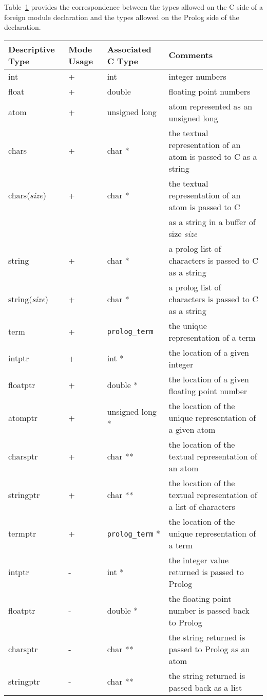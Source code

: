 Table~\ref{table:hltypes} provides the correspondence between the types
allowed on the C side of a foreign module declaration and the types allowed
on the Prolog side of the declaration.

\begin{table}
\label{table:hltypes}
\scriptsize
\begin{tabular}{||l|l|l|l||}
\hline
\hline
Descriptive Type & Mode Usage & Associated C Type & Comments\\ 
\hline
\hline
int & + & int  & integer numbers \\
float & + & double & floating point numbers \\
atom & + & unsigned long & atom represented as an unsigned long\\
chars & + & char * & the textual representation of an atom is passed
to C as a string \\
chars(\emph{size}) & + & char * & the textual representation of an
atom is passed to C \\
& & & as a string in a buffer of size \emph{size} \\ 
string & + & char * & a prolog list of characters is passed to C as a
string \\
string(\emph{size}) & + & char * & a prolog list of characters is
passed to C as a string \\
term & + & {\tt prolog\_term}  & the unique representation of a term\\
intptr & + & int * & the location of a given integer\\
floatptr & + & double * & the location of a given floating point
number \\
atomptr & + & unsigned long * & the location of the unique
representation of a given atom \\
charsptr & + & char ** & the location of the textual representation of
an atom \\
stringptr & + & char ** & the location of the textual representation
of a list of characters \\
termptr & + & {\tt prolog\_term} * & the location of the unique
representation of a term \\
\hline
intptr & - & int * & the integer value returned is passed to Prolog \\
floatptr & - & double * & the floating point number is passed back to
Prolog \\
charsptr & - & char ** & the string returned is passed to Prolog as an
atom \\
stringptr & - & char ** & the string returned is passed back as a list

\end{tabular}
\end{table}
